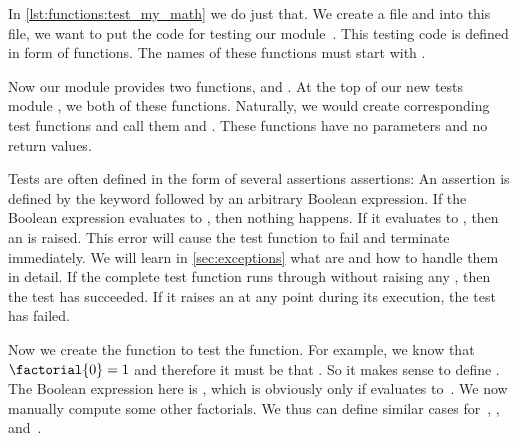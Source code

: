 %
%
%
%
%

In \cref{lst:functions:test_my_math} we do just that.
We create a file  and into this file, we want to put the code for testing our module~.
This testing code is defined in form of functions.
The names of these functions must start with .

Now our module  provides two functions,  and .
At the top of our new tests module , we  both of these functions.
Naturally, we would create corresponding test functions and call them  and .
These functions have no parameters and no return values.

Tests are often defined in the form of several assertions assertions:%
%
%
%
An assertion is defined by the keyword  followed by an arbitrary Boolean expression.
If the Boolean expression evaluates to , then nothing happens.
If it evaluates to , then an  is raised.
This error will cause the test function to fail and terminate immediately.
We will learn in \cref{sec:exceptions} what  are and how to handle them in detail.
If the complete test function runs through without raising any , then the test has succeeded.
If it raises an  at any point during its execution, the test has failed.

Now we create the function  to test the  function.
For example, we know that $\factorial{0}=1$ and therefore it must be that .
So it makes sense to define .
The Boolean expression here is , which is obviously only  if  evaluates to~.
We now manually compute some other factorials.
We thus can define similar cases for~, , and~.

